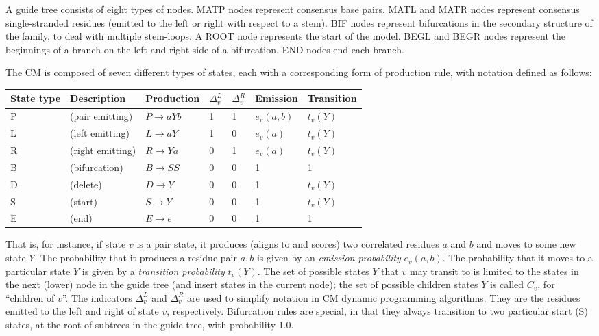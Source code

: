 \documentclass[11pt]{article}
\newif\ifdraft
\begin{document}
\ifdraft

\fi

A guide tree consists of eight types of nodes. MATP nodes represent
consensus base pairs. MATL and MATR nodes represent consensus
single-stranded residues (emitted to the left or right with respect to
a stem). BIF nodes represent bifurcations in the secondary structure
of the family, to deal with multiple stem-loops. A ROOT node
represents the start of the model. BEGL and BEGR nodes represent the
beginnings of a branch on the left and right side of a bifurcation.
END nodes end each branch.

The CM is composed of seven different types of states, each with a
corresponding form of production rule, with notation defined as
follows:

\vspace{0.5em}
\begin{tabular}{lllllll}
State type & Description &  Production   & $\Delta_v^{L}$ & $\Delta_v^{R}$ & Emission & Transition\\ \hline
P & (pair emitting)   & $P \rightarrow a Y b$ & 1 & 1 & $e_v(a,b)$ & $t_v(Y)$  \\
L & (left emitting)   & $L \rightarrow a Y$   & 1 & 0 & $e_v(a)$   & $t_v(Y)$  \\
R & (right emitting)  & $R \rightarrow Y a$   & 0 & 1 & $e_v(a)$   & $t_v(Y)$  \\
B & (bifurcation)     & $B \rightarrow S S$   & 0 & 0 & 1     &     1     \\
D & (delete)          & $D \rightarrow Y$     & 0 & 0 & 1     &   $t_v(Y)$  \\
S & (start)           & $S \rightarrow Y$     & 0 & 0 &    1     & $t_v(Y)$  \\
E & (end)             & $E \rightarrow \epsilon$ & 0 & 0 & 1     &     1     \\
\end{tabular}
\vspace{0.5em}

That is, for instance, if state $v$ is a pair state, it produces
(aligns to and scores) two correlated residues $a$ and $b$ and moves
to some new state $Y$.  The probability that it produces a residue
pair $a,b$ is given by an \emph{emission probability} $e_v(a,b)$.  The
probability that it moves to a particular state $Y$ is given by a
\emph{transition probability} $t_v(Y)$.  The set of possible states
$Y$ that $v$ may transit to is limited to the states in the next
(lower) node in the guide tree (and insert states in the current
node); the set of possible children states $Y$ is called $C_v$, for
``children of $v$''. The indicators $\Delta_v^{L}$ and $\Delta_v^{R}$
are used to simplify notation in CM dynamic programming algorithms.
They are the residues emitted to the left and right of state $v$,
respectively. Bifurcation rules are special, in that they always
transition to two particular start (S) states, at the root of
subtrees in the guide tree, with probability 1.0.
\end{document}
